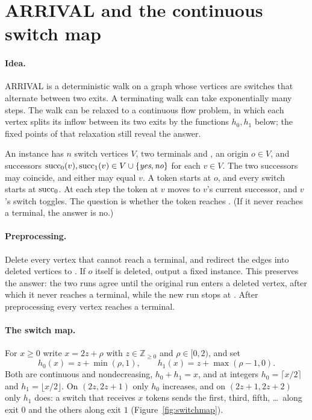\section{ARRIVAL and the continuous switch map}\label{sec:pre-arrival}

\paragraph{Idea.} ARRIVAL is a deterministic walk on a graph whose vertices are switches that alternate
between two exits. A terminating walk can take exponentially many steps.
The walk can be relaxed to a continuous flow problem, in which each vertex splits its inflow
between its two exits by the functions $h_0,h_1$ below; the fixed points of that relaxation still reveal
the answer.

\begin{definition}\label{def:arrival}
An instance has $n$ switch vertices $V$, two terminals \yes{} and \no{}, an origin $o\in V$, and
successors $\mathrm{succ}_0(v),\mathrm{succ}_1(v)\in V\cup\{\textit{yes},\textit{no}\}$ for each $v\in V$. The two successors may
coincide, and either may equal $v$. A token starts at $o$, and every switch starts at $\mathrm{succ}_0$. At each
step the token at $v$ moves to $v$'s current successor, and $v$'s switch toggles. The question is
whether the token reaches \yes{}. (If it never reaches a terminal, the answer is no.)
\end{definition}

\paragraph{Preprocessing.} Delete every vertex that cannot reach a terminal, and redirect the edges
into deleted vertices to \no{}. If $o$ itself is deleted, output a fixed \no{} instance. This preserves
the answer: the two runs agree until the original run enters a deleted vertex, after which it never
reaches a terminal, while the new run stops at \no{}. After preprocessing every vertex reaches a
terminal.

\paragraph{The switch map.} For $x\ge0$ write $x=2z+\rho$ with $z\in\mathbb{Z}_{\ge0}$ and
$\rho\in[0,2)$, and set
\[
h_0(x)=z+\min(\rho,1),\qquad h_1(x)=z+\max(\rho-1,0).
\]
Both are continuous and nondecreasing, $h_0+h_1=x$, and at integers $h_0=\lceil x/2\rceil$ and
$h_1=\lfloor x/2\rfloor$. On $(2z,2z+1)$ only $h_0$ increases, and on $(2z+1,2z+2)$ only $h_1$ does: a
switch that receives $x$ tokens sends the first, third, fifth, \dots\ along exit $0$ and the others along
exit $1$ (Figure~\ref{fig:switchmap}).

